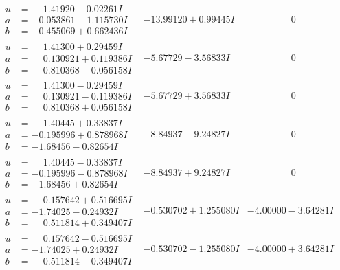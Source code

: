 \documentclass[1p]{elsarticle_modified}
\theoremstyle{definition}
\begin{document}
$$\begin{array}{c|c|c}
\begin{aligned}
u &= \phantom{-}1.41920 - 0.02261 I \\
a &= -0.053861 - 1.115730 I \\
b &= -0.455069 + 0.662436 I\end{aligned}
 & -13.99120 + 0.99445 I & \phantom{-0.000000 } 0 \\ \hline\begin{aligned}
u &= \phantom{-}1.41300 + 0.29459 I \\
a &= \phantom{-}0.130921 + 0.119386 I \\
b &= \phantom{-}0.810368 - 0.056158 I\end{aligned}
 & -5.67729 - 3.56833 I & \phantom{-0.000000 } 0 \\ \hline\begin{aligned}
u &= \phantom{-}1.41300 - 0.29459 I \\
a &= \phantom{-}0.130921 - 0.119386 I \\
b &= \phantom{-}0.810368 + 0.056158 I\end{aligned}
 & -5.67729 + 3.56833 I & \phantom{-0.000000 } 0 \\ \hline\begin{aligned}
u &= \phantom{-}1.40445 + 0.33837 I \\
a &= -0.195996 + 0.878968 I \\
b &= -1.68456 - 0.82654 I\end{aligned}
 & -8.84937 - 9.24827 I & \phantom{-0.000000 } 0 \\ \hline\begin{aligned}
u &= \phantom{-}1.40445 - 0.33837 I \\
a &= -0.195996 - 0.878968 I \\
b &= -1.68456 + 0.82654 I\end{aligned}
 & -8.84937 + 9.24827 I & \phantom{-0.000000 } 0 \\ \hline\begin{aligned}
u &= \phantom{-}0.157642 + 0.516695 I \\
a &= -1.74025 - 0.24932 I \\
b &= \phantom{-}0.511814 + 0.349407 I\end{aligned}
 & -0.530702 + 1.255080 I & -4.00000 - 3.64281 I \\ \hline\begin{aligned}
u &= \phantom{-}0.157642 - 0.516695 I \\
a &= -1.74025 + 0.24932 I \\
b &= \phantom{-}0.511814 - 0.349407 I\end{aligned}
 & -0.530702 - 1.255080 I & -4.00000 + 3.64281 I \\ \hline\begin{aligned}

\end{aligned}
\end{array}$$
\end{document}
